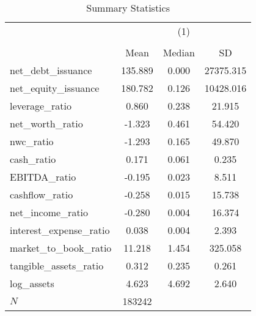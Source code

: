 \begin{table}[htbp]\centering
\def\sym#1{\ifmmode^{#1}\else\(^{#1}\)\fi}
\caption{Summary Statistics}
\begin{tabular}{l*{1}{ccc}}
\hline\hline
            &\multicolumn{3}{c}{(1)}               \\
            &\multicolumn{3}{c}{}                  \\
            &        Mean&      Median&          SD\\
\hline
net\_debt\_issuance&     135.889&       0.000&   27375.315\\
net\_equity\_issuance&     180.782&       0.126&   10428.016\\
leverage\_ratio&       0.860&       0.238&      21.915\\
net\_worth\_ratio&      -1.323&       0.461&      54.420\\
nwc\_ratio   &      -1.293&       0.165&      49.870\\
cash\_ratio  &       0.171&       0.061&       0.235\\
EBITDA\_ratio&      -0.195&       0.023&       8.511\\
cashflow\_ratio&      -0.258&       0.015&      15.738\\
net\_income\_ratio&      -0.280&       0.004&      16.374\\
interest\_expense\_ratio&       0.038&       0.004&       2.393\\
market\_to\_book\_ratio&      11.218&       1.454&     325.058\\
tangible\_assets\_ratio&       0.312&       0.235&       0.261\\
log\_assets  &       4.623&       4.692&       2.640\\
\hline
\(N\)       &      183242&            &            \\
\hline\hline
\end{tabular}
\end{table}
